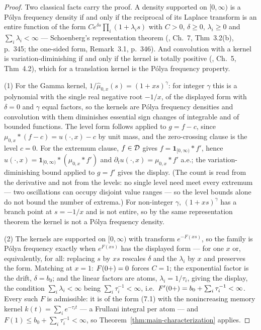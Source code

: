 \begin{proof}
Two classical facts carry the proof. A density supported on $[0,\infty)$ is a P\'olya
frequency density if and only if the reciprocal of its Laplace transform is an entire
function of the form $C e^{\delta s}\prod_i (1 + \lambda_i s)$ with $C > 0$, $\delta \ge 0$,
$\lambda_i \ge 0$ and $\sum_i \lambda_i < \infty$ --- Schoenberg's representation theorem
(, Ch.~7, Thm~3.2(b), p.~345; the one-sided form, Remark~3.1,
p.~346). And convolution with a kernel is variation-diminishing if and only if the kernel is
totally positive (, Ch.~5, Thm~4.2), which for a translation kernel
is the P\'olya frequency property.

(1) For the Gamma kernel, $1/\widehat{\mu}_{0,x}(s) = (1 + xs)^{\gamma}$: for integer
$\gamma$ this is a polynomial with the single real negative root $-1/x$, of the displayed
form with $\delta = 0$ and $\gamma$ equal factors, so the kernels are P\'olya frequency
densities and convolution with them diminishes essential sign changes of integrable and of
bounded functions. The level form follows applied to $g = f - c$, since
$\mu_{0,x} * (f - c) = u(\cdot,x) - c$ by unit mass, and the zero-crossing clause is the
level $c = 0$. For the extremum clause, $f \in \mathcal{D}$ gives
$f = \mathbf{1}_{[0,\infty)} * f'$, hence
$u(\cdot,x) = \mathbf{1}_{[0,\infty)} * (\mu_{0,x} * f')$ and
$\partial_t u(\cdot,x) = \mu_{0,x} * f'$ a.e.; the variation-diminishing bound applied to
$g = f'$ gives the display. (The count is read from the derivative and not from the
levels: no single level need meet every extremum --- two oscillations can occupy disjoint
value ranges --- so the level bounds alone do not bound the number of extrema.) For
non-integer $\gamma$, $(1 + xs)^{\gamma}$ has
a branch point at $s = -1/x$ and is not entire, so by the same representation theorem the
kernel is not a P\'olya frequency density.

(2) The kernels are supported on $[0,\infty)$ with transform $e^{-F(xs)}$, so the family is
P\'olya frequency exactly when $e^{F(xs)}$ has the displayed form --- for one $x$ or,
equivalently, for all: replacing $s$ by $xs$ rescales $\delta$ and the $\lambda_i$ by $x$
and preserves the form. Matching at $x = 1$: $F(0{+}) = 0$ forces $C = 1$; the exponential
factor is the drift, $\delta = b_0$; and the linear factors are atoms, $\lambda_i = 1/\tau_i$,
giving the display, the condition $\sum_i \lambda_i < \infty$ being
$\sum_i \tau_i^{-1} < \infty$, i.e.\ $F'(0{+}) = b_0 + \sum_i \tau_i^{-1} < \infty$.
Every such $F$ is admissible: it is of the form (7.1) with the nonincreasing memory kernel
$k(t) = \sum_i e^{-\tau_i t}$ --- a Frullani integral per atom --- and
$F(1) \le b_0 + \sum_i \tau_i^{-1} < \infty$, so Theorem~\ref{thm:main-characterization}
applies.
\end{proof}

